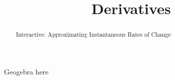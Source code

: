 \documentclass[handout]{ximera}
\title{Derivatives}
\begin{document}
\begin{abstract} Interactive: Approximating Instantaneous Rates of Change %
\end{abstract}

\maketitle

Geogebra here
\end{document}
